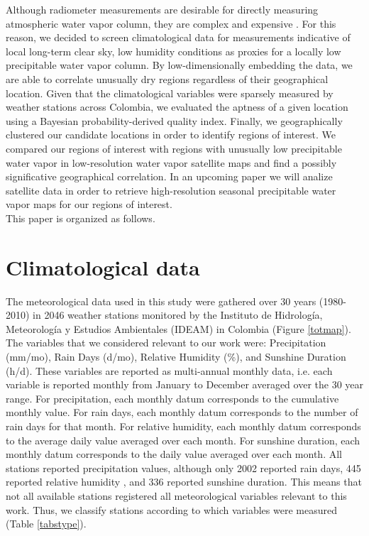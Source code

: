 \documentclass[12pt]{iopart}
\begin{document}
Although radiometer measurements are desirable for directly measuring atmospheric water vapor column, they are complex and expensive \cite{radiopro,receiver}. For this reason, we decided to screen climatological data for measurements indicative of local long-term clear sky, low humidity conditions as proxies for a locally low precipitable water vapor column. By low-dimensionally embedding the data, we are able to correlate unusually dry regions regardless of their geographical location. Given that the climatological variables were sparsely measured by weather stations across Colombia, we evaluated the aptness of a given location using a Bayesian probability-derived quality index. Finally, we geographically clustered our candidate locations in order to identify regions of interest. We compared our regions of interest with regions with unusually low precipitable water vapor in low-resolution water vapor satellite maps \cite{suen2016} and find a possibly significative geographical correlation.  In an upcoming paper we will analize satellite data in order to retrieve high-resolution seasonal precipitable water vapor maps for our regions of interest.\\

This paper is organized as follows.
  
  
\section{Climatological data}

The meteorological data used in this study were gathered over 30 years (1980-2010) in 2046 weather stations monitored by the Instituto de Hidrolog\'ia, Meteorolog\'ia y Estudios Ambientales (IDEAM) in Colombia (Figure \ref{totmap}). The  variables that we considered relevant to our work were: Precipitation (mm/mo), Rain Days (d/mo),  Relative Humidity (\%), and Sunshine Duration (h/d). These variables are reported as multi-annual monthly data, i.e. each variable is reported monthly from January to December averaged over the 30 year range. For precipitation, each monthly datum corresponds to the cumulative monthly value.  For rain days, each monthly datum corresponds to the number of rain days for that month.  For relative humidity, each monthly datum corresponds to the  average daily value averaged over each month. For sunshine duration, each monthly datum corresponds to the daily value averaged over each month. All stations reported precipitation values, although only 2002 reported rain days, 445 reported relative humidity , and 336 reported sunshine duration. This means that not all available stations registered all meteorological variables relevant to this work. Thus, we classify stations according to which variables were measured (Table \ref{tabstype}).\\
\end{document}
